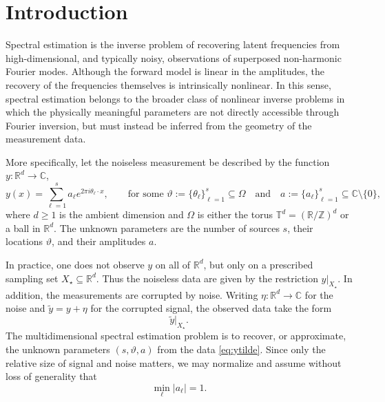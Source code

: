 \documentclass[11pt]{article}
\theoremstyle{definition}
\numberwithin{theorem}{section}
\numberwithin{lemma}{section}
\numberwithin{equation}{section}
\def\C{\mathbb{C}}
\def\R{\mathbb{R}}
\def\T{\mathbb{T}}
\def\Z{\mathbb{Z}}
\renewcommand{\subset}{\subseteq}
\renewcommand{\tilde}{\widetilde}
\newcommand{\domain}{\Omega}
\newcommand{\sampset}{X}
\newcommand{\bfa}{a}
\def\andspace{\quad\text{and}\quad}
\numberwithin{equation}{section}
\begin{document}
	
	\setcounter{tocdepth}{1}
	\tableofcontents
		
			
		\section{Introduction}

Spectral estimation is the inverse problem of recovering latent frequencies from high-dimensional, and typically noisy, observations of superposed non-harmonic Fourier modes. Although the forward model is linear in the amplitudes, the recovery of the frequencies themselves is intrinsically nonlinear. In this sense, spectral estimation belongs to the broader class of nonlinear inverse problems in which the physically meaningful parameters are not directly accessible through Fourier inversion, but must instead be inferred from the geometry of the measurement data.

More specifically, let the noiseless measurement be described by the function $y\colon \R^d\to\C$,
\begin{equation}
\label{eq:y}
y(x)=\sum_{\ell=1}^s a_\ell e^{2\pi i \theta_\ell\cdot x},
\qquad 
\text{for some }
\vartheta:=\{\theta_\ell\}_{\ell=1}^s\subset \domain
\andspace
\bfa:=\{a_\ell\}_{\ell=1}^s\subset \C\setminus\{0\},
\end{equation}
where $d\ge 1$ is the ambient dimension and $\domain$ is either the torus $\T^d=(\R/\Z)^d$ or a ball in $\R^d$. The unknown parameters are the number of sources $s$, their locations $\vartheta$, and their amplitudes $\bfa$.

In practice, one does not observe $y$ on all of $\R^d$, but only on a prescribed sampling set $\sampset_\star\subset \R^d$. Thus the noiseless data are given by the restriction $y|_{\sampset_\star}$. In addition, the measurements are corrupted by noise. Writing $\eta\colon \R^d\to\C$ for the noise and $\tilde y=y+\eta$ for the corrupted signal, the observed data take the form
\begin{equation}
\label{eq:ytilde}
\tilde y|_{\sampset_\star}.
\end{equation}
The multidimensional spectral estimation problem is to recover, or approximate, the unknown parameters $(s,\vartheta,\bfa)$ from the data \eqref{eq:ytilde}. Since only the relative size of signal and noise matters, we may normalize and assume without loss of generality that
\[
\min_\ell |a_\ell|=1.
\]
\end{document}
